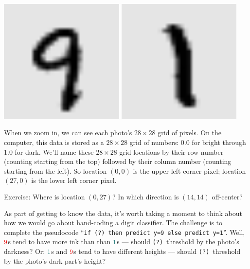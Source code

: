 \documentclass[11pt, justified]{tufte-book}
\newcommand{\attn}[1]{{\bro \textsf{#1}}}
\newcommand{\plainfootprint}{}
\newcommand{\footprint}{\marginnote{\plainfootprint} }
\theoremstyle{definition}
\begin{document}
        \begin{marginfigure}
          \vspace{-3.5cm}
          \includegraphics[width=0.47\textwidth]{example-mnist/mnist-trn-00}%
            \hspace{0.03\textwidth}
          \includegraphics[width=0.47\textwidth]{example-mnist/mnist-trn-01}%
        \end{marginfigure}
        When we zoom in, we can see each photo's $28\times 28$ grid of pixels.
        On the computer, this data is stored as a $28\times 28$ grid of
        numbers: $0.0$ for bright through $1.0$ for dark.  We'll name these
        $28\times28$ grid locations by their row number (counting starting from
        the top) followed by their column number (counting starting from the
        left).  So location $(0,0)$ is the upper left corner pixel; location
        $(27,0)$ is the lower left corner pixel.
        \par\noindent
        \attn{Exercise:} {Where is location $(0,27)$?  %
        In which direction is $(14,14)$ off-center?}

        \footprint
        As part of getting to know the data, it's worth taking a moment to
        think about how we would go about hand-coding a digit classifier.  The
        challenge is to complete the pseudocode
        ``\texttt{if (?)\ then predict y=9 else predict y=1}''.
        Well, ${\red{9}}$s tend to have more ink than than ${\cya{1}}$s ---
        should \texttt{(?)}\ threshold by the photo's darkness?
        Or: ${\cya{1}}$s and ${\red{9}}$s tend to have different heights ---
        should \texttt{(?)}\ threshold by the photo's dark part's height?
\end{document}
